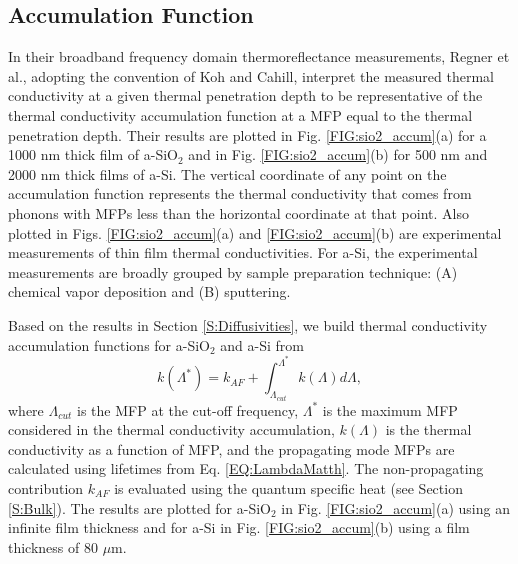 \documentclass[aps,prb,onecolumn,preprint,superscriptaddress,footinbib,amsmath,amssymb,floatfix]{revtex4}
\begin{document}
\subsection{\label{S:Accumulation}Accumulation Function}

In their broadband frequency domain thermoreflectance 
measurements, Regner et al.,\cite{regner_broadband_2013}  
adopting the convention of Koh and Cahill,\cite{koh_frequency_2007} 
interpret the  
measured thermal conductivity at a given thermal penetration depth 
to be representative of the thermal conductivity accumulation 
function at a MFP equal to the thermal penetration depth.  
Their results are plotted in Fig. \ref{FIG:sio2_accum}(a) 
for a 1000 nm thick film of a-SiO$_2$ 
and in Fig. \ref{FIG:sio2_accum}(b) for 500 nm and 
2000 nm thick films of a-Si. The vertical coordinate 
of any point on the accumulation function represents the thermal 
conductivity that comes from phonons with MFPs less than the 
horizontal coordinate at that point. Also plotted in 
Figs. \ref{FIG:sio2_accum}(a) and \ref{FIG:sio2_accum}(b) 
are experimental measurements of thin film thermal 
conductivities. For a-Si, the experimental measurements are 
broadly grouped by sample preparation technique: 
(A) chemical vapor deposition
\cite{moon_thermal_2002,liu_high_2009,yang_anomalously_2010}
and (B) sputtering.
\cite{kuo_thermal_1992,cahill_thermal_1994,wada_thermal_1996} 

Based on the results in Section \ref{S:Diffusivities}, we build 
thermal conductivity accumulation functions for a-SiO$_2$ and a-Si 
from
\begin{equation}\label{EQ:kLambda}
k(\Lambda^{*}) = k_{AF} + 
\int^{\Lambda^{*}}_{\Lambda_{cut}} 
k(\Lambda)d\Lambda,
\end{equation}
where $\Lambda_{cut}$ is the MFP at the cut-off frequency, 
$\Lambda^*$ is the maximum MFP considered in the thermal 
conductivity accumulation, $k(\Lambda)$ is the thermal conductivity 
as a function of MFP,\cite{yang_mean_2013} 
and the propagating mode MFPs are 
calculated using lifetimes from Eq. \eqref{EQ:LambdaMatth}. The 
non-propagating contribution $k_{AF}$ is evaluated using the quantum 
specific heat (see Section \ref{S:Bulk}). 
The results are plotted for a-SiO$_2$ 
in Fig. \ref{FIG:sio2_accum}(a) using an infinite film thickness 
and for a-Si in Fig. \ref{FIG:sio2_accum}(b) using a film 
thickness of $80$ $\mu$m.\cite{mfp_fn3}  
\end{document}
